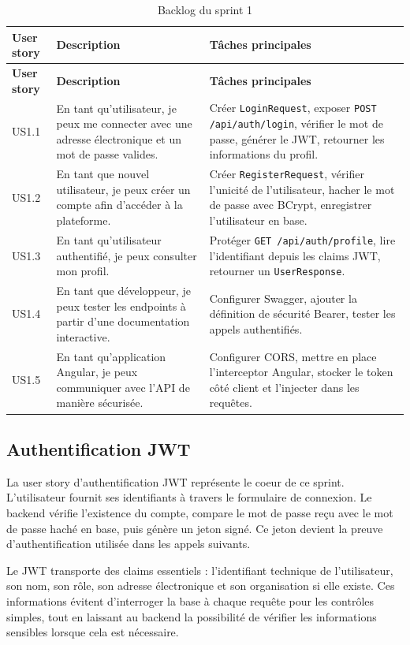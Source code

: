 \documentclass[12pt,a4paper]{report}
\begin{document}
\begin{longtable}{p{} p{} p{}}
\caption{Backlog du sprint 1}\\
\toprule
\textbf{User story} & \textbf{Description} & \textbf{Tâches principales}\\
\midrule
\endfirsthead
\toprule
\textbf{User story} & \textbf{Description} & \textbf{Tâches principales}\\
\midrule
\endhead
US1.1 & En tant qu'utilisateur, je peux me connecter avec une adresse électronique et un mot de passe valides. & Créer \texttt{LoginRequest}, exposer \texttt{POST /api/auth/login}, vérifier le mot de passe, générer le JWT, retourner les informations du profil.\\
\midrule
US1.2 & En tant que nouvel utilisateur, je peux créer un compte afin d'accéder à la plateforme. & Créer \texttt{RegisterRequest}, vérifier l'unicité de l'utilisateur, hacher le mot de passe avec BCrypt, enregistrer l'utilisateur en base.\\
\midrule
US1.3 & En tant qu'utilisateur authentifié, je peux consulter mon profil. & Protéger \texttt{GET /api/auth/profile}, lire l'identifiant depuis les claims JWT, retourner un \texttt{UserResponse}.\\
\midrule
US1.4 & En tant que développeur, je peux tester les endpoints à partir d'une documentation interactive. & Configurer Swagger, ajouter la définition de sécurité Bearer, tester les appels authentifiés.\\
\midrule
US1.5 & En tant qu'application Angular, je peux communiquer avec l'API de manière sécurisée. & Configurer CORS, mettre en place l'interceptor Angular, stocker le token côté client et l'injecter dans les requêtes.\\
\bottomrule
\end{longtable}

\subsection{Authentification JWT}

La user story d'authentification JWT représente le coeur de ce sprint. L'utilisateur fournit ses identifiants à travers le formulaire de connexion. Le backend vérifie l'existence du compte, compare le mot de passe reçu avec le mot de passe haché en base, puis génère un jeton signé. Ce jeton devient la preuve d'authentification utilisée dans les appels suivants.

Le JWT transporte des claims essentiels : l'identifiant technique de l'utilisateur, son nom, son rôle, son adresse électronique et son organisation si elle existe. Ces informations évitent d'interroger la base à chaque requête pour les contrôles simples, tout en laissant au backend la possibilité de vérifier les informations sensibles lorsque cela est nécessaire.
\end{document}
